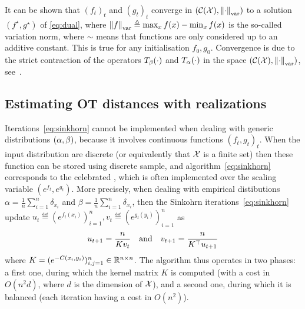 It can be shown that ${(f_t)}_t$ and ${(g_t)}_t$ converge in $(\mathcal{C}(\mathcal{X}),
\left\| \cdot \right\|_{\text{var}})$ to a solution $(f^\star, g^\star)$ of
\eqref{eq:dual}, where $\left\| f \right\|_{\text{var}} \triangleq \max_x f(x) - \min_x f(x)$ is
the so-called variation norm, where $\sim$ means that functions are only considered up to an additive constant. This is true for any initialisation 
$f_0, g_0$.  Convergence is due to the strict contraction of the operators $T_{\beta}(\cdot)$ and
$T_{\alpha}(\cdot)$ in the space $(\mathcal{C}(\mathcal{X}), \left\| \cdot \right\|_{\text{var}})$, see~\cite{peyre2019computational}.

\subsection{Estimating OT distances with realizations}

Iterations~\eqref{eq:sinkhorn} cannot be implemented when dealing with generic distributions $(\alpha,\beta)$, because it involves continuous functions ${(f_t,g_t)}_t$. 
%
When the input distribution are discrete (or equivalently that $\mathcal{X}$ is a finite
set) then these function can be stored using discrete sample, and
algorithm~\eqref{eq:sinkhorn} corresponds to the celebrated
\citet{sinkhorn1967concerning}, which is often implemented over the scaling
variable $(e^{f_t},e^{g_t})$.
%
More precisely, when dealing with empirical distibutions $\alpha =
\frac{1}{n}\sum_{i=1}^n \delta_{x_i}$ and $\beta = \frac{1}{n} \sum_{i=1}^n
\delta_{x_i}$, then the Sinkohrn iterations~\eqref{eq:sinkhorn} update $u_t \eqdef
(e^{f_t(x_i)})_{i=1}^n, v_t \eqdef (e^{g_t(y_i)})_{i=1}^n$ as
\begin{equation*}
	u_{t+1} = \frac{n}{ K v_t }
	\quad \text{and} \quad
	v_{t+1} = \frac{n}{ K^\top u_{t+1} }
\end{equation*}
where $K=(e^{-C(x_i,y_i)})_{i,j=1}^n \in \mathbb{R}^{n \times n}$. The algorithm thus operates in two
phases: a first one, during which the kernel matrix $K$ is computed (with a cost
in $O(n^2 d)$, where $d$ is the dimension of $\mathcal{X}$), and a second one, during
which it is balanced (each iteration having a cost in $O(n^2)$).


